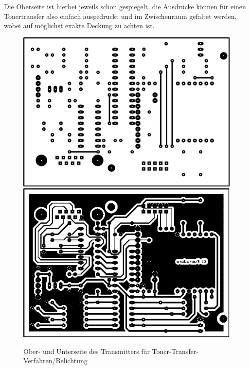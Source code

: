 \documentclass[pdftex, parskip, numbers=noenddot, toc=listof]{scrbook}
\begin{document}
	Die Oberseite ist hierbei jeweils schon gespiegelt, die Ausdrücke können für einen Tonertransfer also einfach ausgedruckt und im Zwischenraum gefaltet werden, wobei auf möglichst exakte Deckung zu achten ist.

	\begin{figure}
		\centering
		\includegraphics[scale=1]{Bilder/Transmittertop}\vspace{5mm}\\
		\includegraphics[scale=1]{Bilder/Transmitterbottom}
		\caption{Ober- und Unterseite des Transmitters für Toner-Transfer-Verfahren/Belichtung}
		\label{fig:transmitterprint}
	\end{figure}
\end{document}
